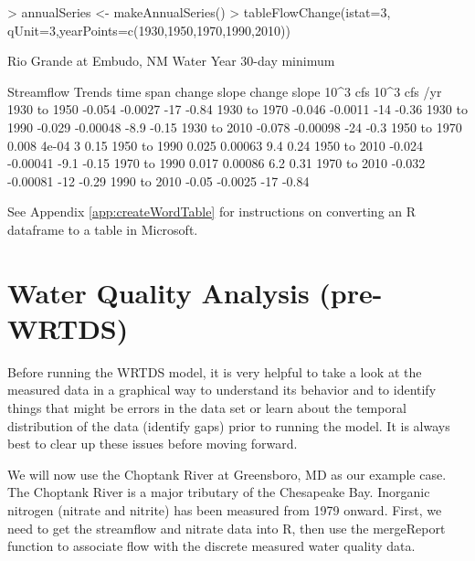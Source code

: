 \documentclass[a4paper,11pt]{article}
\begin{document}
\begin{Schunk}
\begin{Sinput}
> annualSeries <- makeAnnualSeries()
> tableFlowChange(istat=3, qUnit=3,yearPoints=c(1930,1950,1970,1990,2010))
\end{Sinput}
\begin{Soutput}
   Rio Grande at Embudo, NM
   Water Year
    30-day minimum 

             Streamflow Trends
   time span          change        slope       change        slope
                      10^3 cfs 10^3 cfs /yr         %
 1930  to  1950       -0.054      -0.0027          -17        -0.84
 1930  to  1970       -0.046      -0.0011          -14        -0.36
 1930  to  1990       -0.029     -0.00048         -8.9        -0.15
 1930  to  2010       -0.078     -0.00098          -24         -0.3
 1950  to  1970        0.008        4e-04            3         0.15
 1950  to  1990        0.025      0.00063          9.4         0.24
 1950  to  2010       -0.024     -0.00041         -9.1        -0.15
 1970  to  1990        0.017      0.00086          6.2         0.31
 1970  to  2010       -0.032     -0.00081          -12        -0.29
 1990  to  2010        -0.05      -0.0025          -17        -0.84
\end{Soutput}
\end{Schunk}

See Appendix \ref{app:createWordTable} for instructions on converting an R dataframe to a table in Microsoft. 

\FloatBarrier

\section{Water Quality Analysis (pre-WRTDS)}
\label{sec:wqa}
Before running the WRTDS model, it is very helpful to take a look at the measured data in a graphical way to understand its behavior and to identify things that might be errors in the data set or learn about the temporal distribution of the data (identify gaps) prior to running the model.  It is always best to clear up these issues before moving forward.

We will now use the Choptank River at Greensboro, MD as our example case. The Choptank River is a major tributary of the Chesapeake Bay. Inorganic nitrogen (nitrate and nitrite) has been measured from 1979 onward. First, we need to get the streamflow and nitrate data into R, then use the mergeReport function to associate flow with the discrete measured water quality data.
\end{document}
